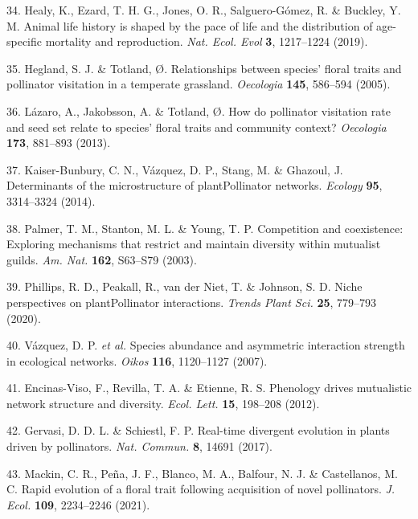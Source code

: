 \documentclass[
  12pt,
  a4paper,
]{article}
\begin{document}
\leavevmode\hypertarget{ref-healy2019}{}%
34. Healy, K., Ezard, T. H. G., Jones, O. R., Salguero-Gómez, R. \& Buckley, Y. M. Animal life history is shaped by the pace of life and the distribution of age-specific mortality and reproduction. \emph{Nat. Ecol. Evol} \textbf{3}, 1217--1224 (2019).

\leavevmode\hypertarget{ref-hegland2005}{}%
35. Hegland, S. J. \& Totland, Ø. Relationships between species' floral traits and pollinator visitation in a temperate grassland. \emph{Oecologia} \textbf{145}, 586--594 (2005).

\leavevmode\hypertarget{ref-lazaro2013}{}%
36. Lázaro, A., Jakobsson, A. \& Totland, Ø. How do pollinator visitation rate and seed set relate to species' floral traits and community context? \emph{Oecologia} \textbf{173}, 881--893 (2013).

\leavevmode\hypertarget{ref-kaiser2014}{}%
37. Kaiser-Bunbury, C. N., Vázquez, D. P., Stang, M. \& Ghazoul, J. Determinants of the microstructure of plantPollinator networks. \emph{Ecology} \textbf{95}, 3314--3324 (2014).

\leavevmode\hypertarget{ref-palmer2003}{}%
38. Palmer, T. M., Stanton, M. L. \& Young, T. P. Competition and coexistence: Exploring mechanisms that restrict and maintain diversity within mutualist guilds. \emph{Am. Nat.} \textbf{162}, S63--S79 (2003).

\leavevmode\hypertarget{ref-phillips2020}{}%
39. Phillips, R. D., Peakall, R., van der Niet, T. \& Johnson, S. D. Niche perspectives on plantPollinator interactions. \emph{Trends Plant Sci.} \textbf{25}, 779--793 (2020).

\leavevmode\hypertarget{ref-vazquez2007}{}%
40. Vázquez, D. P. \emph{et al.} Species abundance and asymmetric interaction strength in ecological networks. \emph{Oikos} \textbf{116}, 1120--1127 (2007).

\leavevmode\hypertarget{ref-encinas2012}{}%
41. Encinas-Viso, F., Revilla, T. A. \& Etienne, R. S. Phenology drives mutualistic network structure and diversity. \emph{Ecol. Lett.} \textbf{15}, 198--208 (2012).

\leavevmode\hypertarget{ref-gervasi2017}{}%
42. Gervasi, D. D. L. \& Schiestl, F. P. Real-time divergent evolution in plants driven by pollinators. \emph{Nat. Commun.} \textbf{8}, 14691 (2017).

\leavevmode\hypertarget{ref-mackin2021}{}%
43. Mackin, C. R., Peña, J. F., Blanco, M. A., Balfour, N. J. \& Castellanos, M. C. Rapid evolution of a floral trait following acquisition of novel pollinators. \emph{J. Ecol.} \textbf{109}, 2234--2246 (2021).
\end{document}
